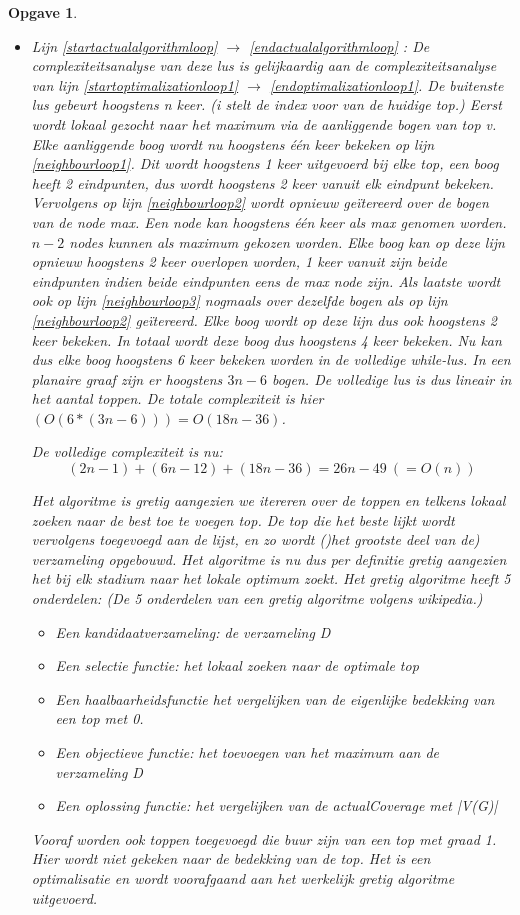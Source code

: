 \documentclass[11pt, a4paper]{article}
\newtheorem{opgave}{Opgave}
\begin{document}
\begin{opgave}
\begin{itemize}
			\item Lijn \ref{startactualalgorithmloop} $\rightarrow$ \ref{endactualalgorithmloop} : De complexiteitsanalyse van deze lus is gelijkaardig aan de complexiteitsanalyse van lijn \ref{startoptimalizationloop1} $\rightarrow$ \ref{endoptimalizationloop1}. De buitenste lus gebeurt hoogstens n keer. (i stelt de index voor van de huidige top.) Eerst wordt lokaal gezocht naar het maximum via de aanliggende bogen van top v. Elke aanliggende boog wordt nu hoogstens \'{e}\'{e}n keer bekeken op lijn \ref{neighbourloop1}. Dit wordt hoogstens 1 keer uitgevoerd bij elke top, een boog heeft 2 eindpunten, dus wordt hoogstens 2 keer vanuit elk eindpunt bekeken. Vervolgens op lijn \ref{neighbourloop2} wordt opnieuw ge\"{i}tereerd over de bogen van de node max. Een node kan hoogstens \'{e}\'{e}n keer als max genomen worden. $n-2$ nodes kunnen als maximum gekozen worden. Elke boog kan op deze lijn opnieuw hoogstens 2 keer overlopen worden, 1 keer vanuit zijn beide eindpunten indien beide eindpunten eens de max node zijn. Als laatste wordt ook op lijn \ref{neighbourloop3} nogmaals over dezelfde bogen als op lijn \ref{neighbourloop2} ge\"{i}tereerd. Elke boog wordt op deze lijn dus ook hoogstens 2 keer bekeken. In totaal wordt deze boog dus hoogstens 4 keer bekeken. Nu kan dus elke boog hoogstens 6 keer bekeken worden in de volledige while-lus. In een planaire graaf zijn er hoogstens $3n-6$ bogen. De volledige lus is dus lineair in het aantal toppen. De totale complexiteit is hier $(O(6*(3n-6)))=O(18n-36)$.
		
		
		De volledige complexiteit is nu: 
		\[(2n-1)+(6n-12)+(18n-36)=26n-49\ (=O(n))\]
		
			Het algoritme is gretig aangezien we itereren over de toppen en telkens lokaal zoeken naar de best toe te voegen top. De top die het beste lijkt wordt vervolgens toegevoegd aan de lijst, en zo wordt ()het grootste deel van de) verzameling opgebouwd. Het algoritme is nu dus per definitie gretig aangezien het bij elk stadium naar het lokale optimum zoekt.
			Het gretig algoritme heeft 5 onderdelen: (De 5 onderdelen van een gretig algoritme volgens wikipedia.)
			\begin{itemize}
				\item Een kandidaatverzameling: de verzameling D
				\item Een selectie functie: het lokaal zoeken naar de optimale top
				\item Een haalbaarheidsfunctie het vergelijken van de eigenlijke bedekking van een top met 0. 
				\item Een objectieve functie: het toevoegen van het maximum aan de verzameling D
				\item Een oplossing functie: het vergelijken van de actualCoverage met |V(G)|
			\end{itemize} 
			 Vooraf worden ook toppen toegevoegd die buur zijn van een top met graad 1. Hier wordt niet gekeken naar de bedekking van de top. Het is een optimalisatie en wordt voorafgaand aan het werkelijk gretig algoritme uitgevoerd. 
		\end{itemize}
\end{opgave}
\end{document}
